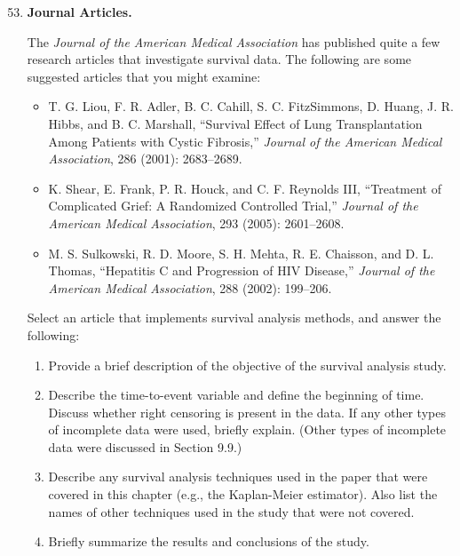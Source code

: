 \documentclass[
]{book}
\begin{document}
\begin{enumerate}
  \setcounter{enumi}{52}

  \item \textbf{Journal Articles.}

The \textit{Journal of the American Medical Association} has published quite a few research articles that investigate survival data. The following are some suggested articles that you might examine:
\begin{itemize}
  \item T. G. Liou, F. R. Adler, B. C. Cahill, S. C. FitzSimmons, D. Huang, J. R. Hibbs, and B. C. Marshall, ``Survival Effect of Lung Transplantation Among Patients with Cystic Fibrosis,'' \textit{Journal of the American Medical Association}, 286 (2001): 2683–2689.
  \item K. Shear, E. Frank, P. R. Houck, and C. F. Reynolds III, ``Treatment of Complicated Grief: A Randomized Controlled Trial,'' \textit{Journal of the American Medical Association}, 293 (2005): 2601–2608.
  \item M. S. Sulkowski, R. D. Moore, S. H. Mehta, R. E. Chaisson, and D. L. Thomas, ``Hepatitis C and Progression of HIV Disease,'' \textit{Journal of the American Medical Association}, 288 (2002): 199–206.
\end{itemize}

Select an article that implements survival analysis methods, and answer the following:
  \begin{enumerate}
    \item Provide a brief description of the objective of the survival analysis study.
    \item Describe the time-to-event variable and define the beginning of time. Discuss whether right censoring is present in the data. If any other types of incomplete data were used, briefly explain. (Other types of incomplete data were discussed in Section 9.9.)
    \item Describe any survival analysis techniques used in the paper that were covered in this chapter (e.g., the Kaplan-Meier estimator). Also list the names of other techniques used in the study that were not covered.
    \item Briefly summarize the results and conclusions of the study.
  \end{enumerate}


\end{enumerate}
\end{document}
